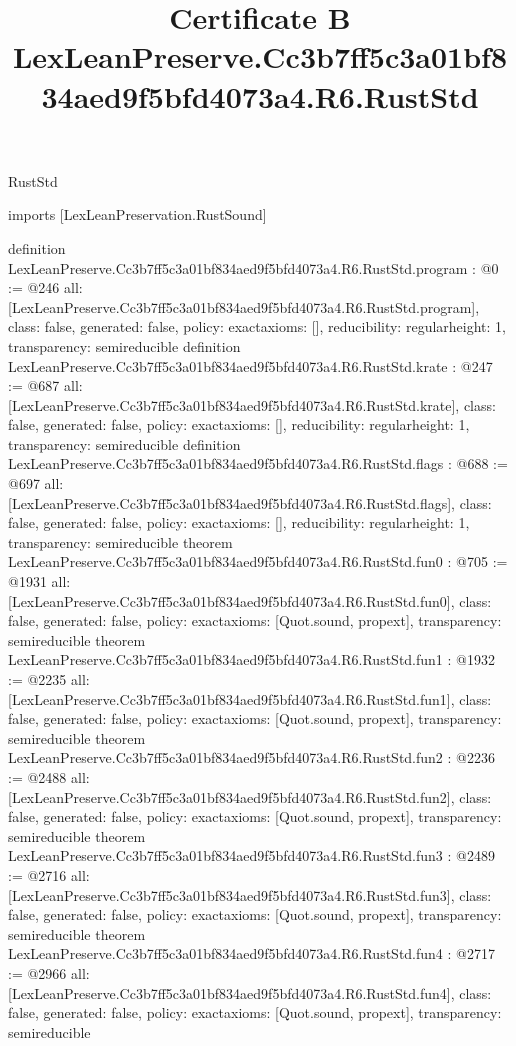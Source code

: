 \begin{lexlean}{RustStd}
\title{Certificate B LexLeanPreserve.Cc3b7ff5c3a01bf834aed9f5bfd4073a4.R6.RustStd}
\begin{coremodule}
imports [LexLeanPreservation.RustSound]

definition LexLeanPreserve.Cc3b7ff5c3a01bf834aed9f5bfd4073a4.R6.RustStd.program : @0 := @246 {
  all: [LexLeanPreserve.Cc3b7ff5c3a01bf834aed9f5bfd4073a4.R6.RustStd.program],
  class: false,
  generated: false,
  policy: exact{axioms: []},
  reducibility: regular{height: 1},
  transparency: semireducible
}
definition LexLeanPreserve.Cc3b7ff5c3a01bf834aed9f5bfd4073a4.R6.RustStd.krate : @247 := @687 {
  all: [LexLeanPreserve.Cc3b7ff5c3a01bf834aed9f5bfd4073a4.R6.RustStd.krate],
  class: false,
  generated: false,
  policy: exact{axioms: []},
  reducibility: regular{height: 1},
  transparency: semireducible
}
definition LexLeanPreserve.Cc3b7ff5c3a01bf834aed9f5bfd4073a4.R6.RustStd.flags : @688 := @697 {
  all: [LexLeanPreserve.Cc3b7ff5c3a01bf834aed9f5bfd4073a4.R6.RustStd.flags],
  class: false,
  generated: false,
  policy: exact{axioms: []},
  reducibility: regular{height: 1},
  transparency: semireducible
}
theorem LexLeanPreserve.Cc3b7ff5c3a01bf834aed9f5bfd4073a4.R6.RustStd.fun0 : @705 := @1931 {
  all: [LexLeanPreserve.Cc3b7ff5c3a01bf834aed9f5bfd4073a4.R6.RustStd.fun0],
  class: false,
  generated: false,
  policy: exact{axioms: [Quot.sound, propext]},
  transparency: semireducible
}
theorem LexLeanPreserve.Cc3b7ff5c3a01bf834aed9f5bfd4073a4.R6.RustStd.fun1 : @1932 := @2235 {
  all: [LexLeanPreserve.Cc3b7ff5c3a01bf834aed9f5bfd4073a4.R6.RustStd.fun1],
  class: false,
  generated: false,
  policy: exact{axioms: [Quot.sound, propext]},
  transparency: semireducible
}
theorem LexLeanPreserve.Cc3b7ff5c3a01bf834aed9f5bfd4073a4.R6.RustStd.fun2 : @2236 := @2488 {
  all: [LexLeanPreserve.Cc3b7ff5c3a01bf834aed9f5bfd4073a4.R6.RustStd.fun2],
  class: false,
  generated: false,
  policy: exact{axioms: [Quot.sound, propext]},
  transparency: semireducible
}
theorem LexLeanPreserve.Cc3b7ff5c3a01bf834aed9f5bfd4073a4.R6.RustStd.fun3 : @2489 := @2716 {
  all: [LexLeanPreserve.Cc3b7ff5c3a01bf834aed9f5bfd4073a4.R6.RustStd.fun3],
  class: false,
  generated: false,
  policy: exact{axioms: [Quot.sound, propext]},
  transparency: semireducible
}
theorem LexLeanPreserve.Cc3b7ff5c3a01bf834aed9f5bfd4073a4.R6.RustStd.fun4 : @2717 := @2966 {
  all: [LexLeanPreserve.Cc3b7ff5c3a01bf834aed9f5bfd4073a4.R6.RustStd.fun4],
  class: false,
  generated: false,
  policy: exact{axioms: [Quot.sound, propext]},
  transparency: semireducible
}
\end{coremodule}
\end{lexlean}
